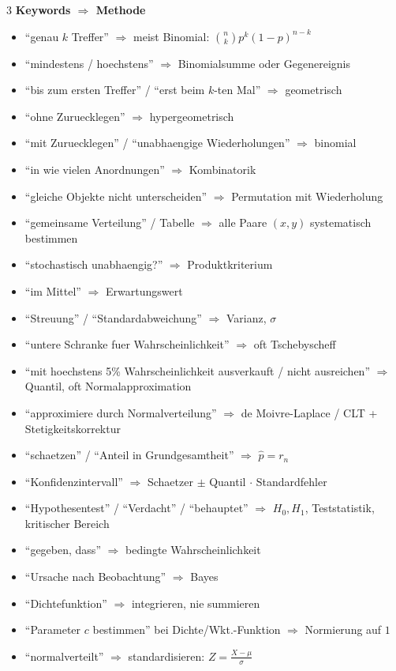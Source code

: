 \documentclass[a4paper,8pt,landscape]{article}
\begin{document}
\begin{multicols*}{3}
\textbf{Keywords $\Rightarrow$ Methode}
\begin{itemize}
  \item ``genau $k$ Treffer'' $\Rightarrow$ meist Binomial: $\binom{n}{k}p^k(1-p)^{n-k}$
  \item ``mindestens / hoechstens'' $\Rightarrow$ Binomialsumme oder Gegenereignis
  \item ``bis zum ersten Treffer'' / ``erst beim $k$-ten Mal'' $\Rightarrow$ geometrisch
  \item ``ohne Zuruecklegen'' $\Rightarrow$ hypergeometrisch
  \item ``mit Zuruecklegen'' / ``unabhaengige Wiederholungen'' $\Rightarrow$ binomial
  \item ``in wie vielen Anordnungen'' $\Rightarrow$ Kombinatorik
  \item ``gleiche Objekte nicht unterscheiden'' $\Rightarrow$ Permutation mit Wiederholung
  \item ``gemeinsame Verteilung'' / Tabelle $\Rightarrow$ alle Paare $(x,y)$ systematisch bestimmen
  \item ``stochastisch unabhaengig?'' $\Rightarrow$ Produktkriterium
  \item ``im Mittel'' $\Rightarrow$ Erwartungswert
  \item ``Streuung'' / ``Standardabweichung'' $\Rightarrow$ Varianz, $\sigma$
  \item ``untere Schranke fuer Wahrscheinlichkeit'' $\Rightarrow$ oft Tschebyscheff
  \item ``mit hoechstens 5\% Wahrscheinlichkeit ausverkauft / nicht ausreichen'' $\Rightarrow$ Quantil, oft Normalapproximation
  \item ``approximiere durch Normalverteilung'' $\Rightarrow$ de Moivre-Laplace / CLT + Stetigkeitskorrektur
  \item ``schaetzen'' / ``Anteil in Grundgesamtheit'' $\Rightarrow$ $\hat p=r_n$
  \item ``Konfidenzintervall'' $\Rightarrow$ Schaetzer $\pm$ Quantil $\cdot$ Standardfehler
  \item ``Hypothesentest'' / ``Verdacht'' / ``behauptet'' $\Rightarrow$ $H_0,H_1$, Teststatistik, kritischer Bereich
  \item ``gegeben, dass'' $\Rightarrow$ bedingte Wahrscheinlichkeit
  \item ``Ursache nach Beobachtung'' $\Rightarrow$ Bayes
  \item ``Dichtefunktion'' $\Rightarrow$ integrieren, nie summieren
  \item ``Parameter $c$ bestimmen'' bei Dichte/Wkt.-Funktion $\Rightarrow$ Normierung auf $1$
  \item ``normalverteilt'' $\Rightarrow$ standardisieren: $Z=\frac{X-\mu}{\sigma}$
\end{itemize}


\end{multicols*}
\end{document}
